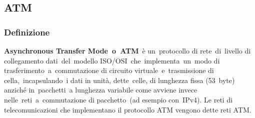 \documentclass{article}
\begin{document}
\subsection{ATM}
\subsubsection{Definizione}
\noindent
\textbf{Asynchronous Transfer Mode o ATM} è un protocollo di rete di livello di collegamento dati del modello 
ISO/OSI che implementa un modo di trasferimento a commutazione di circuito virtuale e trasmissione di 
cella, incapsulando i dati in unità, dette celle, di lunghezza fissa (53 byte) anziché in pacchetti a 
lunghezza variabile come avviene invece nelle reti a commutazione di pacchetto (ad esempio con IPv4). 
Le reti di telecomunicazioni che implementano il protocollo ATM vengono dette reti ATM.
\end{document}
